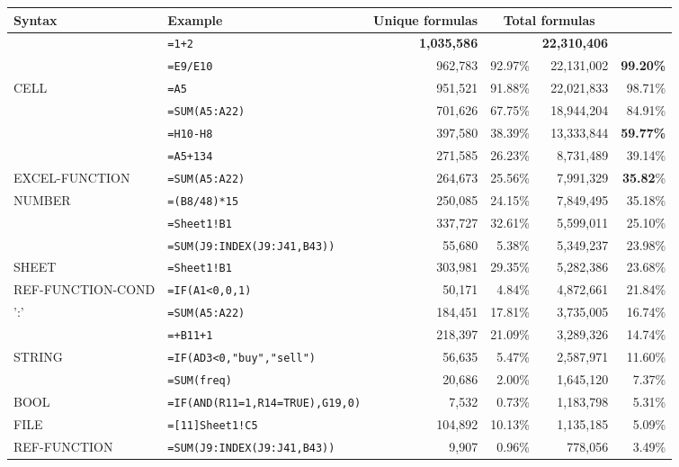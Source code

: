 \begin{tabular}{llrrrrr}
		\hline
		Syntax & Example &  \multicolumn{2}{c}{Unique formulas} & \multicolumn{2}{c}{Total formulas} \\
		\hline
			\synt{Formula} & \texttt{=1+2} &  & \textbf{1,035,586} & & \textbf{22,310,406} & \\
			\synt{Reference} & \texttt{=E9/E10} &  & 962,783 & 92.97\% & 22,131,002 & \textbf{99.20\%}\\
			CELL & \texttt{=A5} &  & 951,521 & 91.88\% & 22,021,833 & 98.71\%\\
			\synt{FunctionCall} & \texttt{=SUM(A5:A22)} &  & 701,626 & 67.75\% & 18,944,204 & {84.91\%}\\
			\synt{BinOp} & \texttt{=H10-H8} &  & 397,580 & 38.39\% & 13,333,844 & \textbf{59.77\%}\\
			\synt{Constant} & \texttt{=A5+134} &  & 271,585 & 26.23\% & 8,731,489 & {39.14\%}\\
			EXCEL-FUNCTION & \texttt{=SUM(A5:A22)} &  & 264,673 & 25.56\% & 7,991,329 & \textbf{35.82}\%\\
			NUMBER & \texttt{=(B8/48)*15} &  & 250,085 & 24.15\% & 7,849,495 & {35.18\%}\\
			\synt{Prefix} & \texttt{=Sheet1!B1} &  & 337,727 & 32.61\% & 5,599,011 & {25.10\%}\\
			\synt{RefFunctionName} & \texttt{=SUM(J9:INDEX(J9:J41,B43))} &  & 55,680 & 5.38\% & 5,349,237 & {23.98\%}\\
			SHEET & \texttt{=Sheet1!B1} &  & 303,981 & 29.35\% & 5,282,386 & 23.68\%\\
			REF-FUNCTION-COND & \texttt{=IF(A1<0,0,1)} &  & 50,171 & 4.84\% & 4,872,661 & {21.84\%}\\
			\synt{Reference} ':' \synt{Reference} & \texttt{=SUM(A5:A22)} &  & 184,451 & 17.81\% & 3,735,005 & {16.74\%}\\
			\synt{UnOpPrefix} & \texttt{=+B11+1} &  & 218,397 & 21.09\% & 3,289,326 & 14.74\%\\
			STRING & \texttt{=IF(AD3<0,"buy","sell")} &  & 56,635 & 5.47\% & 2,587,971 & {11.60\%}\\
			\synt{NamedRange} & \texttt{=SUM(freq)} &  & 20,686 & 2.00\% & 1,645,120 & {7.37\%}\\
			BOOL & \texttt{=IF(AND(R11=1,R14=TRUE),G19,0)} &  & 7,532 & 0.73\% & 1,183,798 & 5.31\%\\
			FILE & \texttt{=[11]Sheet1!C5} &  & 104,892 & 10.13\% & 1,135,185 & {5.09\%}\\
			REF-FUNCTION & \texttt{=SUM(J9:INDEX(J9:J41,B43))} &  & 9,907 & 0.96\% & 778,056 & {3.49\%}\\
			

\end{tabular}
